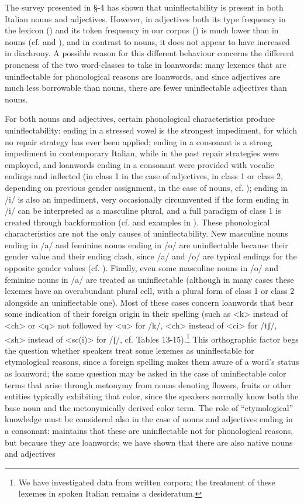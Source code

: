 \documentclass[output=paper]{langscibook}
\begin{document}
The survey presented in §-4 has shown that uninflectability is present in both Italian nouns and adjectives. However, in adjectives both its type frequency in the lexicon () and its token frequency in our corpus () is much lower than in nouns (cf.  and ), and in contrast to nouns, it does not appear to have increased in diachrony. A possible reason for this different behaviour concerns the different proneness of the two word-classes to take in loanwords: many lexemes that are uninflectable for phonological reasons are loanwords, and since adjectives are much less borrowable than nouns, there are fewer uninflectable adjectives than nouns. 

For both nouns and adjectives, certain phonological characteristics produce uninflectability: ending in a stressed vowel is the strongest impediment, for which no repair strategy has ever been applied; ending in a consonant is a strong impediment in contemporary Italian, while in the past repair strategies were employed, and loanwords ending in a consonant were provided with vocalic endings and inflected (in class 1 in the case of adjectives, in class 1 or class 2, depending on previous gender assignment, in the case of nouns, cf. ); ending in /i/ is also an impediment, very occasionally circumvented if the form ending in /i/ can be interpreted as a masculine plural, and a full paradigm of class 1 is created through backformation (cf.  and examples in ). These phonological characteristics are not the only causes of uninflectability. New masculine nouns ending in /a/ and feminine nouns ending in /o/ are uninflectable because their gender value and their ending clash, since /a/ and /o/ are typical endings for the opposite gender values (cf. ). Finally, even some masculine nouns in /o/ and feminine nouns in /a/ are treated as uninflectable (although in many cases these lexemes have an overabundant plural cell, with a plural form of class 1 or class 2 alongside an uninflectable one). Most of these cases concern loanwords that bear some indication of their foreign origin in their spelling (such as <k> instead of <ch> or <q> not followed by <u> for /k/, <ch> instead of <ci> for /tʃ/, <sh> instead of <sc(i)> for /ʃ/, cf. Tables 13-15).\footnote{We have investigated data from written corpora; the treatment of these lexemes in spoken Italian remains a desideratum.}  This orthographic factor begs the question whether speakers treat some lexemes as uninflectable for etymological reasons, since a foreign spelling makes them aware of a word’s status as loanword; the same question may be asked in the case of uninflectable color terms that arise through metonymy from nouns denoting flowers, fruits or other entities typically exhibiting that color, since the speakers normally know both the base noun and the metonymically derived color term. The role of “etymological” knowledge must be considered also in the case of nouns and adjectives ending in a consonant: \citet{Fedden2019} maintains that these are uninflectable not for phonological reasons, but because they are loanwords; we have shown that there are also native nouns and adjectives 
\end{document}
